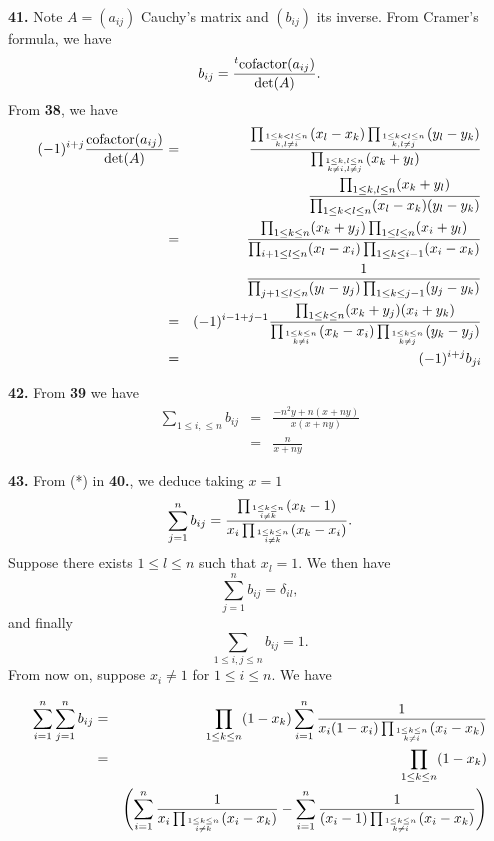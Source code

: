 \documentclass[a4paper,12pt]{article}
\newcommand{\newpar}[1]{\bigskip \noindent \textbf{#1.}}
\begin{document}
\newpar{41} Note $A = (a_{ij})$ Cauchy's matrix and $(b_{ij})$ its
inverse.  From Cramer's formula, we have
\[ b_{ij} = \frac{{}^t\textmd{cofactor}(a_{ij})}{\textmd{det}(A)}.\]
From \textbf{38}, we have
\begin{eqnarray*}
  (-1)^{i+j}\frac{\textmd{cofactor}(a_{ij})}{\textmd{det}(A)} &=&
  \frac{\prod_{1\le k<l\le n\atop k,l\not=i}(x_l -
    x_k)\prod_{1\le k<l\le n\atop k,l\not=j}(y_l-y_k)} {\prod_{1\le
      k,l\le n\atop k\not= i, l\not=
      j}(x_k+y_l)} \\ &&
  \frac{\prod_{1\le k,l\le n}(x_k+y_l)}{\prod_{1\le k<l\le n}(x_l -
    x_k)(y_l-y_k)} \\
  &=& \frac{\prod_{1\le k\le n}(x_k+y_j)\prod_{1\le l\le n}(x_i+y_l)}
       {\prod_{i+1\le l\le n}(x_l-x_i) \prod_{1\le k\le
           i-1}(x_i-x_k)} \\ &&
       \frac{1}{\prod_{j+1\le l\le n}(y_l-y_j)\prod_{1\le k\le
           j-1}(y_j-y_k)} \\
  &=& (-1)^{i-1+j-1}\frac{\prod_{1\le k\le n}(x_k+y_j)(x_i+y_k)}{\prod_{1\le k\le
           n\atop k\not= i}(x_k-x_i)\prod_{1\le k\le n\atop
           k\not=j}(y_k-y_j)} \\
  &=& (-1)^{i+j}b_{ji}
\end{eqnarray*}

\newpar{42} From \textbf{39} we have
\begin{eqnarray*}
  \sum_{1\le i,\le n}b_{ij} &=&
  \frac{-n^2y + n(x+ny)}{x(x+ny)} \\
  &=& \frac{n}{x+ny}
\end{eqnarray*}

\newpar{43}
From (*) in \textbf{40.}, we deduce taking $x = 1$
\[ \sum_{j=1}^n b_{ij} =
\frac{\prod_{1\le k\le n\atop i\not= k}(x_k - 1)} {x_i \prod_{1\le
    k\le n\atop i\not= k}(x_k - x_i)}.\]
Suppose there exists $1\le l\le n$ such that $x_l = 1$.  We then have
\[ \sum_{j=1}^n b_{ij} = \delta_{il},\]
and finally
\[ \sum_{1\le i,j\le n}b_{ij} = 1.\]
From now on, suppose $x_i \not= 1$ for $1\le i\le n$.  We have

\begin{eqnarray*}
  \sum_{i=1}^n\sum_{j=1}^n b_{ij} &=&
  \prod_{1\le k\le n} (1 -
  x_k)\sum_{i=1}^n\frac{1}{x_i(1-x_i)\prod_{1\le k\le n\atop k\not=
      i}(x_i - x_k)} \\ &=&
  \prod_{1\le k\le n}(1-x_k)\\&&\left(
  \sum_{i=1}^n\frac{1}{x_i\prod_{1\le k\le n\atop i\not= k}(x_i -
    x_k)} - \sum_{i=1}^n\frac{1}{(x_i-1)\prod_{1\le k\le n\atop k\not=
      i}(x_i-x_k)} \right)
\end{eqnarray*}
\end{document}
